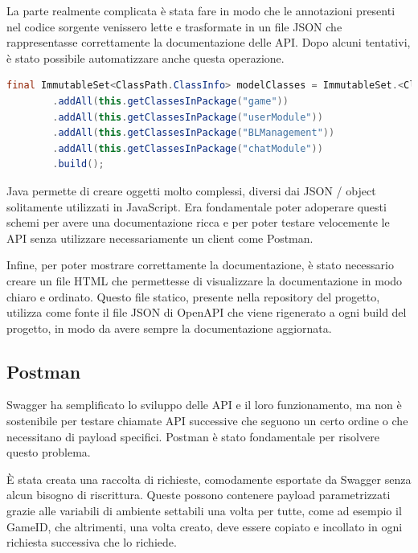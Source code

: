La parte realmente complicata è stata fare in modo che le annotazioni presenti nel codice sorgente venissero lette e trasformate in un file JSON che rappresentasse correttamente la documentazione delle API. 
Dopo alcuni tentativi, è stato possibile automatizzare anche questa operazione.

\begin{lstlisting}[language=Java, caption={Aggiunta dei moduli delle classi contenenti rotte HTTP}, label=list:java_swagger_modules]
final ImmutableSet<ClassPath.ClassInfo> modelClasses = ImmutableSet.<ClassPath.ClassInfo>builder()
        .addAll(this.getClassesInPackage("game"))
        .addAll(this.getClassesInPackage("userModule"))
        .addAll(this.getClassesInPackage("BLManagement"))
        .addAll(this.getClassesInPackage("chatModule"))
        .build();
\end{lstlisting}

\vspace{1cm}

Java permette di creare oggetti molto complessi, diversi dai JSON / object solitamente utilizzati in JavaScript. Era fondamentale poter adoperare questi schemi per avere una documentazione ricca e per poter testare velocemente le API senza utilizzare necessariamente un client come Postman. 

Infine, per poter mostrare correttamente la documentazione, è stato necessario creare un file HTML che permettesse di visualizzare la documentazione in modo chiaro e ordinato. Questo file statico, presente nella repository del progetto, utilizza come fonte il file JSON di OpenAPI che viene rigenerato a ogni build del progetto, in modo da avere sempre la documentazione aggiornata.

\subsection{Postman}

Swagger ha semplificato lo sviluppo delle API e il loro funzionamento, ma non è sostenibile per testare chiamate API successive che seguono un certo ordine o che necessitano di payload specifici. Postman è stato fondamentale per risolvere questo problema.

È stata creata una raccolta di richieste, comodamente esportate da Swagger senza alcun bisogno di riscrittura. Queste possono contenere payload parametrizzati grazie alle variabili di ambiente settabili una volta per tutte, come ad esempio il GameID, che altrimenti, una volta creato, deve essere copiato e incollato in ogni richiesta successiva che lo richiede.

